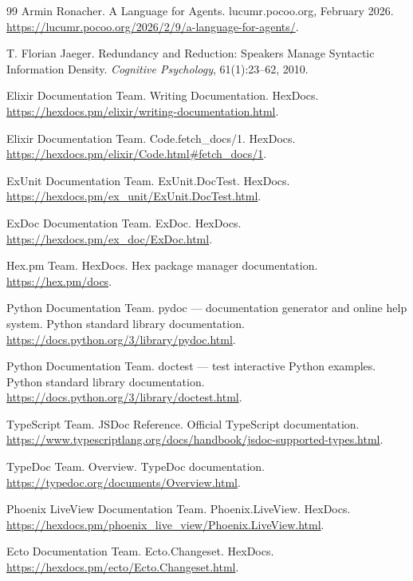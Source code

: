\documentclass[11pt]{article}
\begin{document}
\begin{thebibliography}{99}
Armin Ronacher.
\newblock A Language for Agents.
\newblock lucumr.pocoo.org, February 2026.
\newblock \url{https://lucumr.pocoo.org/2026/2/9/a-language-for-agents/}.

T. Florian Jaeger.
\newblock Redundancy and Reduction: Speakers Manage Syntactic Information Density.
\newblock \emph{Cognitive Psychology}, 61(1):23--62, 2010.

Elixir Documentation Team.
\newblock Writing Documentation.
\newblock HexDocs.
\newblock \url{https://hexdocs.pm/elixir/writing-documentation.html}.

Elixir Documentation Team.
\newblock Code.fetch\_docs/1.
\newblock HexDocs.
\newblock \url{https://hexdocs.pm/elixir/Code.html#fetch_docs/1}.

ExUnit Documentation Team.
\newblock ExUnit.DocTest.
\newblock HexDocs.
\newblock \url{https://hexdocs.pm/ex_unit/ExUnit.DocTest.html}.

ExDoc Documentation Team.
\newblock ExDoc.
\newblock HexDocs.
\newblock \url{https://hexdocs.pm/ex_doc/ExDoc.html}.

Hex.pm Team.
\newblock HexDocs.
\newblock Hex package manager documentation.
\newblock \url{https://hex.pm/docs}.

Python Documentation Team.
\newblock pydoc --- documentation generator and online help system.
\newblock Python standard library documentation.
\newblock \url{https://docs.python.org/3/library/pydoc.html}.

Python Documentation Team.
\newblock doctest --- test interactive Python examples.
\newblock Python standard library documentation.
\newblock \url{https://docs.python.org/3/library/doctest.html}.

TypeScript Team.
\newblock JSDoc Reference.
\newblock Official TypeScript documentation.
\newblock \url{https://www.typescriptlang.org/docs/handbook/jsdoc-supported-types.html}.

TypeDoc Team.
\newblock Overview.
\newblock TypeDoc documentation.
\newblock \url{https://typedoc.org/documents/Overview.html}.

Phoenix LiveView Documentation Team.
\newblock Phoenix.LiveView.
\newblock HexDocs.
\newblock \url{https://hexdocs.pm/phoenix_live_view/Phoenix.LiveView.html}.

Ecto Documentation Team.
\newblock Ecto.Changeset.
\newblock HexDocs.
\newblock \url{https://hexdocs.pm/ecto/Ecto.Changeset.html}.


\end{thebibliography}
\end{document}
